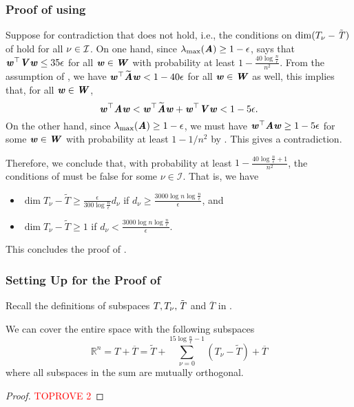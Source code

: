 \subsubsection*{Proof of  using }
Suppose for contradiction that  does not hold, i.e., the conditions on $\dim{T_\nu-\Ttil}$ of  hold for all $\nu \in \cal{I}$.
 On one hand, since $\lambda_{\max}(\AA)\geq 1-\epsilon$,  says that $\ww^{\top}\VV\ww\leq 35 \epsilon$ for all $\ww \in \WW$ with probability at least $1-\frac{40\log\frac{n}{\epsilon}}{n^2}$.
 From the assumption of , we have $\ww^{\top}\AAtil\ww < 1- 40\epsilon$ for all $\ww\in \WW$ as well, this implies that, for all $\ww \in \WW$,
\[
\ww^{\top}\AA\ww < \ww^{\top}\AAtil\ww +\ww^{\top}\VV\ww < 1-5\epsilon.
\]
On the other hand, since $\lambda_{\max}(\AA)\geq 1- \epsilon$, we must have  $\ww^{\top}\AA\ww \geq 1-5\epsilon$ for some $\ww\in \WW$ with probability at least $1-1/n^2$ by  .
This gives a contradiction. 

Therefore, we conclude that, with probability at least $1-\frac{40\log\frac{n}{\epsilon}+1}{n^2}$, the conditions of  must be false for some $\nu \in \mathcal{I}$. That is, we have
\begin{itemize}
\item $\dim{T_{\nu} -\tilde{T}} \geq \frac{\epsilon}{300\log\frac{n}{\epsilon}} d_{\nu}$ if $d_{\nu} \geq \frac{3000\log n\log\frac{n}{\epsilon}}{\epsilon}$, and 
\item $\dim{T_{\nu} -\tilde{T}} \geq 1$ if $d_{\nu} < \frac{3000\log n\log\frac{n}{\epsilon}}{\epsilon}$.
\end{itemize}
This concludes the proof of .


\subsubsection*{Setting Up for the Proof of }

Recall the definitions of subspaces $T,T_\nu,\Ttil$ and $\overline{T}$ in .

\begin{proposition}\label{prop:decomp space}
We can cover the entire space with the following subspaces
\begin{equation}\label{eq:SplitSpace}
 \mathbb{R}^n = T + \overline{T} = \tilde{T} + \sum_{\nu = 0}^{15\log \frac{n}{\epsilon}-1}(T_{\nu} -\tilde{T}) + \overline{T}
\end{equation}
where all subspaces in the sum are mutually orthogonal.
\end{proposition}
\begin{proof}\textcolor{red}{TOPROVE 2}\end{proof}


